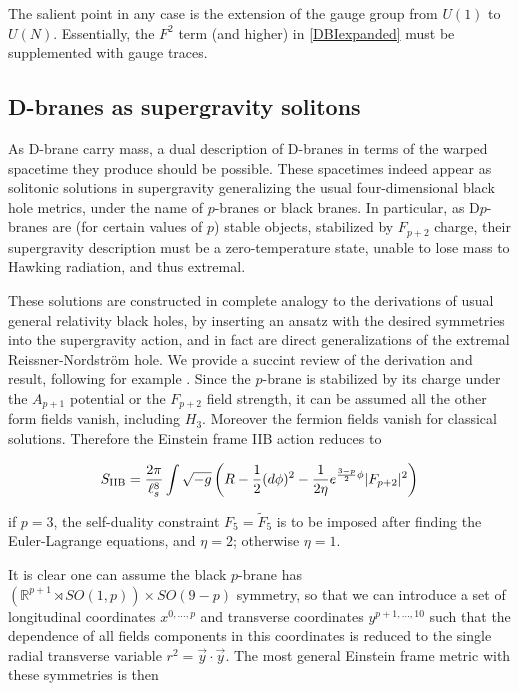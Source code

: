 The salient point in any case is the extension of the gauge group from $U(1)$ to $U(N)$. Essentially, the $F^2$ term (and higher) in \eqref{DBIexpanded} must be supplemented with gauge traces.


\subsection{D-branes as supergravity solitons}\label{sec:pbranes}

As D-brane carry mass, a dual description of D-branes in terms of the warped spacetime they produce should be possible. These spacetimes indeed appear as solitonic solutions in supergravity generalizing the usual four-dimensional black hole metrics, under the name of $p$-branes or black branes. In particular, as D$p$-branes are (for certain values of $p$) stable objects, stabilized by $F_{p+2}$ charge, their supergravity description must be a zero-temperature state, unable to lose mass to Hawking radiation, and thus extremal.

These solutions are constructed in complete analogy to the derivations of usual general relativity black holes, by inserting an ansatz with the desired symmetries into the supergravity action, and in fact are direct generalizations of the extremal Reissner-Nordstr\"om hole. We provide a succint review of the derivation and result, following for example \cite{MaldacenaDb}. Since the $p$-brane is stabilized by its charge under the $A_{p+1}$ potential or the $F_{p+2}$ field strength, it can be assumed all the other form fields vanish, including $H_3$. Moreover the fermion fields vanish for classical solutions. Therefore the Einstein frame IIB action reduces to

\begin{equation}
	S_\text{IIB} = \frac{2\pi}{\ell_s^8} \int \sqrt{-g} \left( R - \frac{1}{2}(d\phi)^2 - \frac{1}{2\eta} e^{\frac{3-p}{2} \phi} |F_{p+2}|^2 \right)
	\label{simplifaction}
\end{equation}

if $p=3$, the self-duality constraint $F_5 = \tilde F_5$ is to be imposed after finding the Euler-Lagrange equations, and $\eta = 2$; otherwise $\eta = 1$.

It is clear one can assume the black $p$-brane has $\left( \mathbb{R}^{p+1} \rtimes SO(1,p) \right)\times SO(9-p)$ symmetry, so that we can introduce a set of longitudinal coordinates $x^{0,\ldots,p}$ and transverse coordinates $y^{p+1,\ldots,10}$ such that the dependence of all fields components in this coordinates is reduced to the single radial transverse variable $r^2 = \vec y \cdot \vec y$. The most general Einstein frame metric with these symmetries is then

